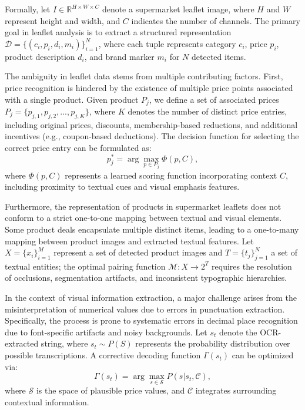 \documentclass[11pt]{article}
\begin{document}
Formally, let $I \in \mathbb{R}^{H \times W \times C}$ denote a supermarket leaflet image, where $H$ and $W$ represent height and width, and $C$ indicates the number of channels. The primary goal in leaflet analysis is to extract a structured representation $\mathcal{D} = \{(c_i, p_i, d_i, m_i)\}_{i=1}^{N}$, where each tuple represents category $c_i$, price $p_i$, product description $d_i$, and brand marker $m_i$ for $N$ detected items.

The ambiguity in leaflet data stems from multiple contributing factors. First, price recognition is hindered by the existence of multiple price points associated with a single product. Given product $P_j$, we define a set of associated prices $P_j = \{ p_{j,1}, p_{j,2}, ..., p_{j,K} \}$, where $K$ denotes the number of distinct price entries, including original prices, discounts, membership-based reductions, and additional incentives (e.g., coupon-based deductions). The decision function for selecting the correct price entry can be formulated as:
\begin{equation}
    p^*_j = \arg\max_{p \in P_j} \Phi(p, C),
\end{equation}
where $\Phi(p, C)$ represents a learned scoring function incorporating context $C$, including proximity to textual cues and visual emphasis features.

Furthermore, the representation of products in supermarket leaflets does not conform to a strict one-to-one mapping between textual and visual elements. Some product deals encapsulate multiple distinct items, leading to a one-to-many mapping between product images and extracted textual features. Let $X = \{x_i\}_{i=1}^{M}$ represent a set of detected product images and $T = \{t_j\}_{j=1}^{N}$ a set of textual entities; the optimal pairing function $\mathcal{M}: X \to 2^T$ requires the resolution of occlusions, segmentation artifacts, and inconsistent typographic hierarchies.

In the context of visual information extraction, a major challenge arises from the misinterpretation of numerical values due to errors in punctuation extraction. Specifically, the process is prone to systematic errors in decimal place recognition due to font-specific artifacts and noisy backgrounds. Let $s_t$ denote the OCR-extracted string, where $s_t \sim P(S)$ represents the probability distribution over possible transcriptions. A corrective decoding function $\Gamma(s_t)$ can be optimized via:
\begin{equation}
    \Gamma(s_t) = \arg\max_{s \in \mathcal{S}} P(s | s_t, \mathcal{C}),
\end{equation}
where $\mathcal{S}$ is the space of plausible price values, and $\mathcal{C}$ integrates surrounding contextual information.
\end{document}
